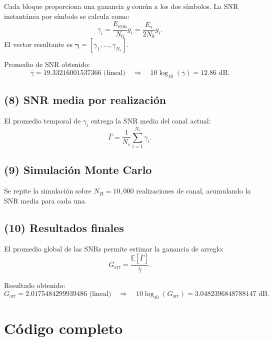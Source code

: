 \documentclass[11pt]{article}
\begin{document}
Cada bloque proporciona una ganancia $g$ común a los dos símbolos.  
La SNR instantánea por símbolo se calcula como:
\[
\gamma_i = \frac{E_{\text{sym}}}{N_0} g_i = \frac{E_s}{2N_0} g_i.
\]
El vector resultante es $\boldsymbol{\gamma} = [\gamma_1, \ldots, \gamma_{N_s}]$.


\noindent Promedio de SNR obtenido:
\[
\overline{\gamma} = 19.33216001537366 \text{ (lineal)} \quad \Rightarrow \quad
10\log_{10}(\overline{\gamma}) = 12.86 \text{ dB.}
\]

\subsection*{(8) SNR media por realización}

El promedio temporal de $\gamma_i$ entrega la SNR media del canal actual:
\[
\bar{\Gamma} = \frac{1}{N_s}\sum_{i=1}^{N_s} \gamma_i.
\]

\subsection*{(9) Simulación Monte Carlo}

Se repite la simulación sobre $N_H=10{,}000$ realizaciones de canal, acumulando la SNR media para cada una.

\subsection*{(10) Resultados finales}

El promedio global de las SNRs permite estimar la ganancia de arreglo:
\[
G_{\text{arr}} = \frac{\mathbb{E}[\bar{\Gamma}]}{\bar{\gamma}}.
\]

\noindent Resultado obtenido:
\[
G_{\text{arr}} = 2.0175484299939486 \text{ (lineal)} \quad
\Rightarrow \quad 10\log_{10}(G_{\text{arr}}) = 3.0482396848788147 \text{ dB.}
\]

\section*{Código completo}
\begin{mdframed}[backgroundcolor=gray!10,linecolor=black!10]
\inputminted[fontsize=\scriptsize,breaklines]{python}{problema29.py}
\end{mdframed}
\end{document}
